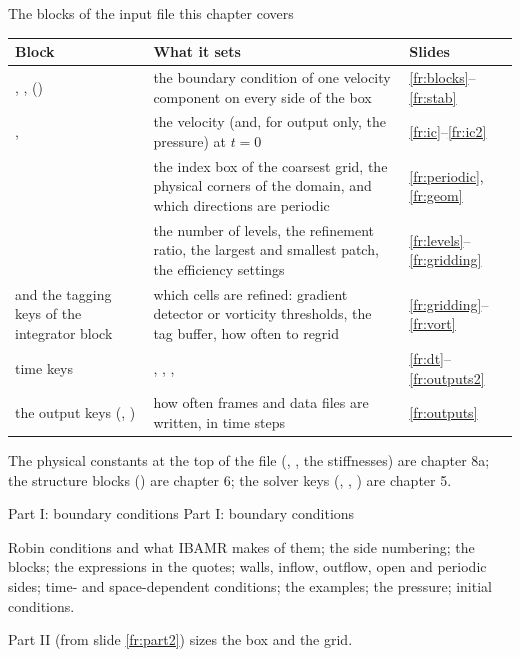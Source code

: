 \documentclass[aspectratio=169,11pt]{beamer}
\begin{document}
\begin{frame}{The blocks of the input file this chapter covers}
\label{fr:blocksmap}
\scriptsize
\setlength{\tabcolsep}{4pt}
\begin{tabular}{@{}L{0.26\textwidth}L{0.40\textwidth}L{0.2\textwidth}@{}}
\toprule
Block & What it sets & Slides\\
\midrule
{}, , () & the boundary condition of one velocity component on every side of the box & \ref{fr:blocks}--\ref{fr:stab}\\
,  & the velocity (and, for output only, the pressure) at $t = 0$ & \ref{fr:ic}--\ref{fr:ic2}\\
 & the index box of the coarsest grid, the physical corners of the domain, and which directions are periodic & \ref{fr:periodic}, \ref{fr:geom}\\
 & the number of levels, the refinement ratio, the largest and smallest patch, the efficiency settings & \ref{fr:levels}--\ref{fr:gridding}\\
 and the tagging keys of the integrator block & which cells are refined: gradient detector or vorticity thresholds, the tag buffer, how often to regrid & \ref{fr:gridding}--\ref{fr:vort}\\
 time keys & , , ,  & \ref{fr:dt}--\ref{fr:outputs2}\\
the output keys (, ) & how often frames and data files are written, in time steps & \ref{fr:outputs}\\
\bottomrule
\end{tabular}

\vspace{2mm}
\small The physical constants at the top of the file (, , the stiffnesses) are chapter 8a; the structure blocks () are chapter 6; the solver keys (, , ) are chapter 5.
\end{frame}

\begin{frame}{Part I: boundary conditions}
\label{fr:part1}
\Large\color{NavyBlue} Part I: boundary conditions\par
\vspace{3mm}
\normalsize\color{black}
Robin conditions and what IBAMR makes of them; the side numbering; the  blocks; the expressions in the quotes; walls, inflow, outflow, open and periodic sides; time- and space-dependent conditions; the examples; the pressure; initial conditions.
\vspace{3mm}

\small Part II (from slide \ref{fr:part2}) sizes the box and the grid.
\end{frame}
\end{document}

